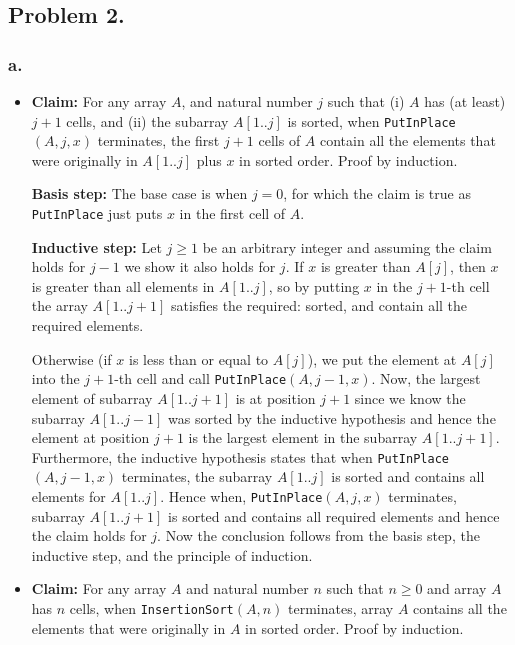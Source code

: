 \documentclass[11pt, letterpaper, titlepage]{article}
\begin{document}
\newpage
\subsection*{Problem 2.}
\subsubsection*{a.}
\begin{itemize}
    \item \textbf{Claim:} For any array $A$, and natural number $j$ such that (i) $A$ has (at least) $j + 1$ cells, and (ii) the subarray $A[1..j]$ is sorted, when \lstinline{PutInPlace}$(A,j,x)$ terminates, the first $j+1$ cells of $A$ contain all the elements that were originally in $A[1..j]$ plus $x$ in sorted order. Proof by induction.

    \textbf{Basis step:} The base case is when $j = 0$, for which the claim is true as \lstinline{PutInPlace} just puts $x$ in the first cell of $A$.
    
    \textbf{Inductive step:} Let $j \geq 1$ be an arbitrary integer and assuming the claim holds for $j - 1$ we show it also holds for $j$. If $x$ is greater than $A[j]$, then $x$ is greater than all elements in $A[1..j]$, so by putting $x$ in the $j + 1$-th cell the array $A[1..j+1]$ satisfies the required: sorted, and contain all the required elements. 
    
    Otherwise (if $x$ is less than or equal to $A[j]$), we put the element at $A[j]$ into the $j + 1$-th cell and call \lstinline{PutInPlace}$(A,j-1,x)$. Now, the largest element of subarray $A[1..j+1]$ is at position $j+1$ since we know the subarray $A[1..j-1]$ was sorted by the inductive hypothesis and hence the element at position $j+1$ is the largest element in the subarray $A[1..j+1]$. Furthermore, the inductive hypothesis states that when \lstinline{PutInPlace}$(A,j-1,x)$ terminates, the subarray $A[1..j]$ is sorted and contains all elements for $A[1..j]$. Hence when, \lstinline{PutInPlace}$(A,j,x)$ terminates, subarray $A[1..j+1]$ is sorted and contains all required elements and hence the claim holds for $j$. Now the conclusion follows from the basis step, the inductive step, and the principle of induction.

    \item \textbf{Claim:} For any array $A$ and natural number $n$ such that $n \geq 0$ and array $A$ has $n$ cells, when \lstinline{InsertionSort}$(A,n)$ terminates, array $A$ contains all the elements that were originally in $A$ in sorted order. Proof by induction.
    

\end{itemize}
\end{document}
